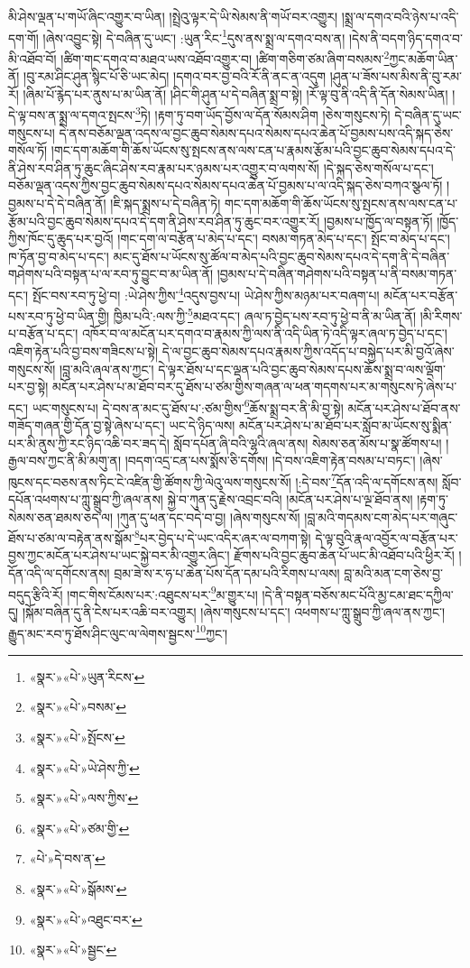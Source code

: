 མི་ཤེས་ལྡན་པ་གཡོ་ཞིང་འགྱུར་བ་ཡིན། །སྤྲེའུ་ལྟར་དེ་ཡི་སེམས་ནི་གཡོ་བར་འགྱུར། །སྨྲ་ལ་དགའ་བའི་ཉེས་པ་འདི་དག་གོ། །ཞེས་འབྱུང་སྟེ། དེ་བཞིན་དུ་ཡང་། :ཡུན་རིང་\footnote{«སྣར་»«པེ་»ཡུན་རིངས་}དུས་ནས་སྨྲ་ལ་དགའ་བས་ན། །དེས་ནི་བདག་ཉིད་དགའ་བ་མི་འཐོབ་བོ། །ཚིག་གང་དགའ་བ་མཐའ་ཡས་འཐོབ་འགྱུར་བ། །ཚིག་གཅིག་ཙམ་ཞིག་བསམས་\footnote{«སྣར་»«པེ་»བསམ་}ཀྱང་མཆོག་ཡིན་ནོ། །བུ་རམ་ཤིང་ཤུན་སྙིང་པོ་ཅི་ཡང་མེད། །དགའ་བར་བྱ་བའི་རོ་ནི་ནང་ན་འདུག །ཤུན་པ་ཟོས་པས་མིས་ནི་བུ་རམ་རོ། །ཞིམ་པོ་རྙེད་པར་ནུས་པ་མ་ཡིན་ནོ། །ཤིང་གི་ཤུན་པ་དེ་བཞིན་སྨྲ་བ་སྟེ། །རོ་ལྟ་བུ་ནི་འདི་ནི་དོན་སེམས་ཡིན། །དེ་ལྟ་བས་ན་སྨྲ་ལ་དགའ་སྤངས་\footnote{«སྣར་»«པེ་»སྤོངས་}ཏེ། །རྟག་ཏུ་བག་ཡོད་བྱོས་ལ་དོན་སོམས་ཤིག །ཅེས་གསུངས་ཏེ། དེ་བཞིན་དུ་ཡང་གསུངས་པ། དེ་ནས་བཅོམ་ལྡན་འདས་ལ་བྱང་ཆུབ་སེམས་དཔའ་སེམས་དཔའ་ཆེན་པོ་བྱམས་པས་འདི་སྐད་ཅེས་གསོལ་ཏོ། །གང་དག་མཆོག་གི་ཆོས་ཡོངས་སུ་སྤངས་ནས་ལས་ངན་པ་རྣམས་རྩོམ་པའི་བྱང་ཆུབ་སེམས་དཔའ་དེ་ནི་ཤེས་རབ་ཤིན་ཏུ་ཆུང་ཞིང་ཤེས་རབ་རྣམ་པར་ཉམས་པར་འགྱུར་བ་ལགས་སོ། །དེ་སྐད་ཅེས་གསོལ་པ་དང་། བཅོམ་ལྡན་འདས་ཀྱིས་བྱང་ཆུབ་སེམས་དཔའ་སེམས་དཔའ་ཆེན་པོ་བྱམས་པ་ལ་འདི་སྐད་ཅེས་བཀའ་སྩལ་ཏོ། །བྱམས་པ་དེ་དེ་བཞིན་ནོ། །ཇི་སྐད་སྨྲས་པ་དེ་བཞིན་ཏེ། གང་དག་མཆོག་གི་ཆོས་ཡོངས་སུ་སྤངས་ནས་ལས་ངན་པ་རྩོམ་པའི་བྱང་ཆུབ་སེམས་དཔའ་དེ་དག་ནི་ཤེས་རབ་ཤིན་ཏུ་ཆུང་བར་འགྱུར་རོ། །བྱམས་པ་ཁྱོད་ལ་བསྟན་ཏོ། །ཁྱོད་ཀྱིས་ཁོང་དུ་ཆུད་པར་བྱའོ། །གང་དག་ལ་བརྩོན་པ་མེད་པ་དང་། བསམ་གཏན་མེད་པ་དང་། སྤོང་བ་མེད་པ་དང་། ཁ་ཏོན་བྱ་བ་མེད་པ་དང་། མང་དུ་ཐོས་པ་ཡོངས་སུ་ཚོལ་བ་མེད་པའི་བྱང་ཆུབ་སེམས་དཔའ་དེ་དག་ནི་དེ་བཞིན་གཤེགས་པའི་བསྟན་པ་ལ་རབ་ཏུ་བྱུང་བ་མ་ཡིན་ནོ། །བྱམས་པ་དེ་བཞིན་གཤེགས་པའི་བསྟན་པ་ནི་བསམ་གཏན་དང་། སྤོང་བས་རབ་ཏུ་ཕྱེ་བ། :ཡེ་ཤེས་ཀྱིས་\footnote{«སྣར་»«པེ་»ཡེ་ཤེས་ཀྱི་}འདུས་བྱས་པ། ཡེ་ཤེས་ཀྱིས་མཉམ་པར་བཞག་པ། མངོན་པར་བརྩོན་པས་རབ་ཏུ་ཕྱེ་བ་ཡིན་གྱི། ཁྱིམ་པའི་:ལས་ཀྱི་\footnote{«སྣར་»«པེ་»ལས་ཀྱིས་}མཐའ་དང་། ཞལ་ཏ་བྱེད་པས་རབ་ཏུ་ཕྱེ་བ་ནི་མ་ཡིན་ནོ། །མི་རིགས་པ་བརྩོན་པ་དང་། འཁོར་བ་ལ་མངོན་པར་དགའ་བ་རྣམས་ཀྱི་ལས་ནི་འདི་ཡིན་ཏེ་འདི་ལྟར་ཞལ་ཏ་བྱེད་པ་དང་། འཇིག་རྟེན་པའི་བྱ་བས་གཟིངས་པ་སྟེ། དེ་ལ་བྱང་ཆུབ་སེམས་དཔའ་རྣམས་ཀྱིས་འདོད་པ་བསྐྱེད་པར་མི་བྱའོ་ཞེས་གསུངས་སོ། །བླ་མའི་ཞལ་ནས་ཀྱང་། དེ་ལྟར་ཐོས་པ་དང་ལྡན་པའི་བྱང་ཆུབ་སེམས་དཔས་ཆོས་སྨྲ་བ་ལས་ལྡོག་པར་བྱ་སྟེ། མངོན་པར་ཤེས་པ་མ་ཐོབ་བར་དུ་ཐོས་པ་ཙམ་གྱིས་གཞན་ལ་ཕན་གདགས་པར་མ་གསུངས་ཏེ་ཞེས་པ་དང་། ཡང་གསུངས་པ། དེ་བས་ན་མང་དུ་ཐོས་པ་:ཙམ་གྱིས་\footnote{«སྣར་»«པེ་»ཙམ་གྱི་}ཆོས་སྨྲ་བར་ནི་མི་བྱ་སྟེ། མངོན་པར་ཤེས་པ་ཐོབ་ནས་གཟོད་གཞན་གྱི་དོན་བྱ་སྟེ་ཞེས་པ་དང་། ཡང་དེ་ཉིད་ལས། མངོན་པར་ཤེས་པ་མ་ཐོབ་པར་སློབ་མ་ཡོངས་སུ་སྨིན་པར་མི་ནུས་ཀྱི་རང་ཉིད་འཆི་བར་ཟད་དེ། སློབ་དཔོན་ཞི་བའི་ལྷའི་ཞལ་ནས། སེམས་ཅན་མོས་པ་སྣ་ཚོགས་པ། །རྒྱལ་བས་ཀྱང་ནི་མི་མགུ་ན། །བདག་འདྲ་ངན་པས་སྨོས་ཅི་དགོས། །དེ་བས་འཇིག་རྟེན་བསམ་པ་བཏང་། །ཞེས་ཁུངས་དང་བཅས་ནས་ཏིང་ངེ་འཛིན་གྱི་ཚོགས་ཀྱི་ལེའུ་ལས་གསུངས་སོ། །:དེ་བས་\footnote{«པེ་»དེ་བས་ན་}དོན་འདི་ལ་དགོངས་ནས། སློབ་དཔོན་འཕགས་པ་ཀླུ་སྒྲུབ་ཀྱི་ཞལ་ནས། སྐྱེ་བ་ཀུན་དུ་རྗེས་འབྲང་བའི། །མངོན་པར་ཤེས་པ་ལྔ་ཐོབ་ནས། །རྟག་ཏུ་སེམས་ཅན་ཐམས་ཅད་ལ། །ཀུན་དུ་ཕན་དང་བདེ་བ་བྱ། །ཞེས་གསུངས་སོ། །བླ་མའི་གདམས་ངག་མེད་པར་གཞུང་ཐོས་པ་ཙམ་ལ་བརྟེན་ནས་སྒོམ་\footnote{«སྣར་»«པེ་»སྒོམས་}པར་བྱེད་པ་དེ་ཡང་འདིར་ཞར་ལ་བཀག་སྟེ། དེ་ལྟ་བུའི་རྣལ་འབྱོར་ལ་བརྩོན་པར་བྱས་ཀྱང་མངོན་པར་ཤེས་པ་ཡང་སྐྱེ་བར་མི་འགྱུར་ཞིང་། རྫོགས་པའི་བྱང་ཆུབ་ཆེན་པོ་ཡང་མི་འཐོབ་པའི་ཕྱིར་རོ། །དོན་འདི་ལ་དགོངས་ནས། བྲམ་ཟེ་ས་ར་ཧ་པ་ཆེན་པོས་དོན་དམ་པའི་རིགས་པ་ལས། བླ་མའི་མན་ངག་ཅེས་བྱ་བདུད་རྩིའི་རོ། །གང་གིས་ངོམས་པར་:འཐུངས་པར་\footnote{«སྣར་»«པེ་»འཐུང་བར་}མ་གྱུར་པ། །དེ་ནི་བསྟན་བཅོས་མང་པོའི་མྱ་ངམ་ཐང་དཀྱིལ་དུ། །སྐོམ་བཞིན་དུ་ནི་ངེས་པར་འཆི་བར་འགྱུར། །ཞེས་གསུངས་པ་དང་། འཕགས་པ་ཀླུ་སྒྲུབ་ཀྱི་ཞལ་ནས་ཀྱང་། རྒྱུད་མང་རབ་ཏུ་ཐོས་ཤིང་ལུང་ལ་ལེགས་སྦྱངས་\footnote{«སྣར་»«པེ་»སྦྱང་}ཀྱང་། 